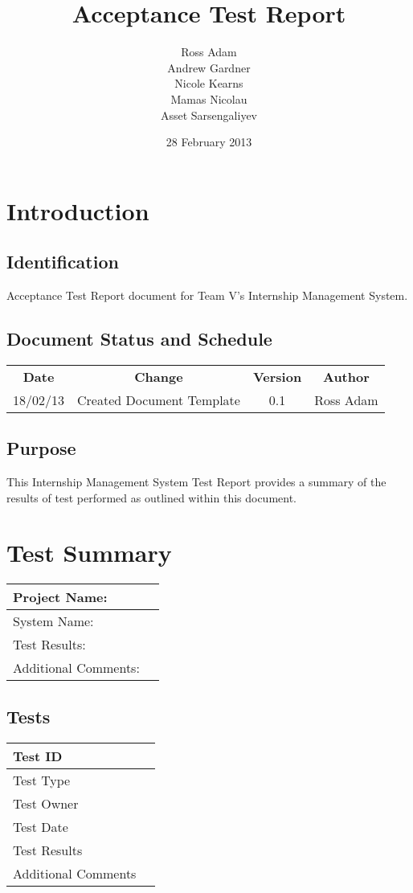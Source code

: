\documentclass{l3deliverable}
\title{Acceptance Test Report}
\author{
  Ross Adam \\
  Andrew Gardner \\
  Nicole Kearns \\
  Mamas Nicolau \\
  Asset Sarsengaliyev \\
  }
\date{28 February 2013}
\begin{document}
\maketitle
\tableofcontents
\newpage
\section{Introduction}
\subsection{Identification}
Acceptance Test Report document for Team V's Internship Management System.
\subsection{Document Status and Schedule}
\begin{center}{
\begin{tabular}{|c|c|c|c|}
\hline \textbf{Date} &\textbf{Change} & \textbf{Version} & \textbf{Author}\\ 
18/02/13 & Created Document Template & 0.1 & Ross Adam\\
\hline 
\end{tabular} }
\end{center}

\subsection{Purpose}
This Internship Management System Test Report provides a summary of the results of test performed as outlined within this document.

\section{Test Summary}

\begin{tabular}{|l|l|}
\hline
Project Name: & \\
\hline
System Name: &\\
\hline
Test Results: &\\
\hline
Additional Comments: &\\
\hline
\end{tabular}

\subsection{Tests}

\begin{tabular}{|l|c|}
\hline
Test ID &\\
\hline
Test Type &\\
\hline
Test Owner  &\\
\hline
Test Date &\\
\hline
Test Results &\\
\hline
Additional Comments &\\
\hline
\end{tabular}
\end{document}
